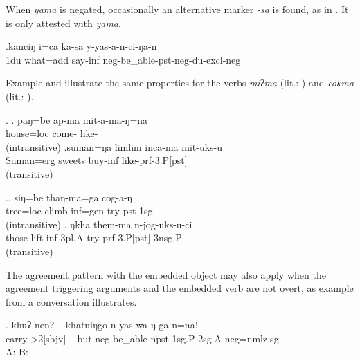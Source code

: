 When  \emph{yama} is negated, occasionally an alternative  marker \emph{-sa} is found, as in \Next. It is only attested with \emph{yama}.

\exg.kanciŋ  i=ca ka-sa y-yas-a-n-ci-ŋa-n\\
{\sc 1du} what{\sc =add} say{\sc -inf} {\sc neg-}be\_able{\sc -pst-neg-du-excl-neg}\\
 


Example \Next  and \NNext illustrate  the same properties for  the verbs \emph{miʔma}  (lit.: ) and  \emph{cokma}  (lit.: ). 

\ex. \ag.   paŋ=be     ap-ma            mit-a-ma-ŋ=na\\  
	house{\sc =loc} come- like-\\
	 (intransitive) 
\bg.suman=ŋa    limlim inca-ma    mit-uks-u\\
Suman{\sc =erg} sweets  buy{\sc -inf}  like{\sc [3sg.A]-prf-3.P[pst]}\\
	 (transitive) 

\ex.\ag.  siŋ=be    thaŋ-ma=ga       cog-a-ŋ\\
tree{\sc =loc} climb{\sc -inf=gen} try{\sc -pst-1sg}\\
  (intransitive) 
\bg. ŋkha them-ma     n-jog-uks-u-ci\\
those lift{\sc -inf} {\sc 3pl.A-}try{\sc -prf-3.P[pst]-3nsg.P}\\
  (transitive) 


The agreement pattern with the embedded object may also apply when the agreement triggering arguments and the embedded verb are not overt, as example \Next from a conversation illustrates.

\exg. khuʔ-nen? – khatniŋgo n-yas-wa-ŋ-ga-n=naǃ\\
carry-{>2[sbjv]}  – but {\sc neg}-be\_able-{\sc npst-1sg.P-2sg.A-neg=nmlz.sg}\\
A:  B: 


